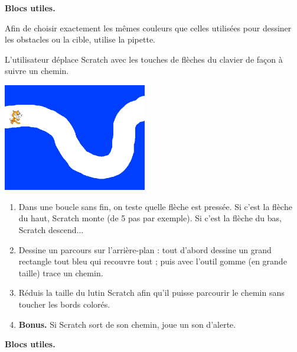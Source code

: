 \documentclass[class=report,crop=false, 12pt]{standalone}
\begin{document}
\begin{activite}
\textbf{Blocs utiles.}
\begin{center}
\begin{scratch}
  { 
    \blockspace
  }
\end{scratch}
\qquad\qquad\qquad
\begin{scratch}
  \blockspace
\end{scratch}
\end{center}
Afin de choisir exactement les mêmes couleurs que celles utilisées pour dessiner les obstacles ou la cible, utilise la pipette.

\end{activite}



\begin{activite}

L'utilisateur déplace Scratch avec les touches de flèches du clavier de façon à suivre un chemin.

\begin{center}
  \includegraphics[width=0.47\textwidth]{ecran-04-ex2} 
\end{center}

\begin{enumerate}
  \item Dans une boucle sans fin, on teste quelle flèche est pressée.
  Si c'est la flèche du haut, Scratch monte (de 5 pas par exemple). Si c'est la flèche du bas, Scratch descend...
  
  \item Dessine un parcours sur l'arrière-plan : tout d'abord dessine un grand rectangle tout bleu qui recouvre tout ; puis avec l'outil gomme (en grande taille) trace un chemin.
  
  \item Réduis la taille du lutin Scratch afin qu'il puisse parcourir le chemin sans toucher les bords colorés.
  
  \item \textbf{Bonus.} Si Scratch sort de son chemin, joue un son d'alerte.
\end{enumerate}


\textbf{Blocs utiles.}
\begin{center}
\begin{scratch}
  { 
    \blockspace
  }
\end{scratch}
\end{center}


\end{activite}
\end{document}
